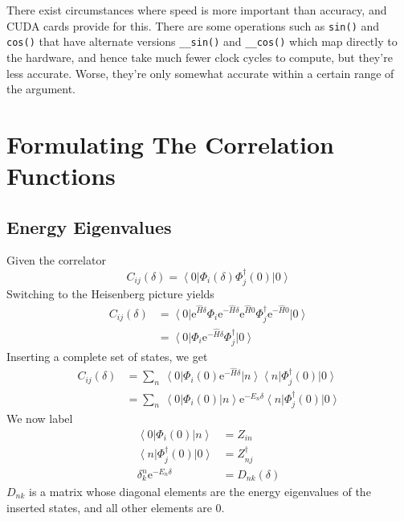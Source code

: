 \documentclass[a4paper,12pt]{report}
\newcommand{\ket}[1]{\ensuremath{\left| #1 \right>}} %
\newcommand{\bra}[1]{\ensuremath{\left< #1 \right|}} %
\renewcommand{\exp}[1]{\ensuremath{\textrm{e}^{ #1 }}}
\begin{document}
There exist circumstances where speed is more important than accuracy, and CUDA cards provide for this.
There are some operations such as \verb!sin()! and \verb!cos()! that have alternate versions \verb!__sin()! and \verb!__cos()! which map directly to the hardware, and hence take much fewer clock cycles to compute, but they're less accurate.
Worse, they're only somewhat accurate within a certain range of the argument.



\chapter{Formulating The Correlation Functions}
\label{chap:correlation_functions}

\section{Energy Eigenvalues}
Given the correlator\cite[p~215]{Lattice_Methods}
%
\begin{equation}
C_{ij}(\delta) = \bra{0} \Phi_i(\delta) \Phi^\dagger_j(0) \ket{0}
\end{equation}
%
Switching to the Heisenberg picture yields
%
\begin{align}
C_{ij}(\delta) 	&= \bra{0} \exp{\hat{H}\delta} \Phi_i \exp{-\hat{H}\delta} \exp{\hat{H}0} \Phi^\dagger_j \exp{-\hat{H}0} \ket{0}\\
%
		&= \bra{0} \Phi_i \exp{-\hat{H} \delta} \Phi^\dagger_j \ket{0}
\end{align}
%
Inserting a complete set of states, we get
%
\begin{align}
C_{ij}(\delta) 	&= \sum_n\ \bra{0} \Phi_i(0) \exp{-\hat{H} \delta} \ket{n}\bra{n} \Phi^\dagger_j(0) \ket{0}\\
%
		&= \sum_n\ \bra{0} \Phi_i(0) \ket{n} \exp{-E_n \delta} \bra{n} \Phi^\dagger_j(0) \ket{0}
\end{align}
%
We now label
%
\begin{align}
\bra{0} \Phi_i(0) \ket{n} &= Z_{in}\\
\bra{n} \Phi^\dagger_j(0) \ket{0} &= Z^\dagger_{nj}\\
\delta^n_k \exp{-E_n \delta} &= D_{nk}(\delta)
\end{align}
%
$D_{nk}$ is a matrix whose diagonal elements are the energy eigenvalues of the inserted states, and all other elements are 0.
\end{document}
